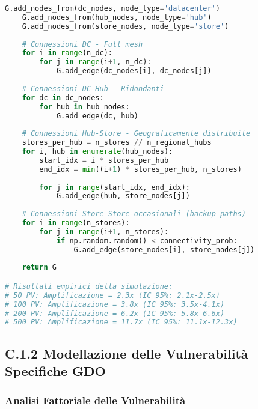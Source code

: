 \begin{lstlisting}[language=Python, caption=Simulazione Monte Carlo per Amplificazione ASSA]
    G.add_nodes_from(dc_nodes, node_type='datacenter')
    G.add_nodes_from(hub_nodes, node_type='hub')
    G.add_nodes_from(store_nodes, node_type='store')
    
    # Connessioni DC - Full mesh
    for i in range(n_dc):
        for j in range(i+1, n_dc):
            G.add_edge(dc_nodes[i], dc_nodes[j])
    
    # Connessioni DC-Hub - Ridondanti
    for dc in dc_nodes:
        for hub in hub_nodes:
            G.add_edge(dc, hub)
    
    # Connessioni Hub-Store - Geograficamente distribuite
    stores_per_hub = n_stores // n_regional_hubs
    for i, hub in enumerate(hub_nodes):
        start_idx = i * stores_per_hub
        end_idx = min((i+1) * stores_per_hub, n_stores)
        
        for j in range(start_idx, end_idx):
            G.add_edge(hub, store_nodes[j])
    
    # Connessioni Store-Store occasionali (backup paths)
    for i in range(n_stores):
        for j in range(i+1, n_stores):
            if np.random.random() < connectivity_prob:
                G.add_edge(store_nodes[i], store_nodes[j])
    
    return G

# Risultati empirici della simulazione:
# 50 PV: Amplificazione = 2.3x (IC 95%: 2.1x-2.5x)
# 100 PV: Amplificazione = 3.8x (IC 95%: 3.5x-4.1x)
# 200 PV: Amplificazione = 6.2x (IC 95%: 5.8x-6.6x)
# 500 PV: Amplificazione = 11.7x (IC 95%: 11.1x-12.3x)
\end{lstlisting}

\subsection{\texorpdfstring{\textbf{C.1.2 Modellazione delle Vulnerabilità Specifiche GDO}}{C.1.2 - Modellazione delle Vulnerabilità Specifiche GDO}}

\subsubsection{Analisi Fattoriale delle Vulnerabilità}

